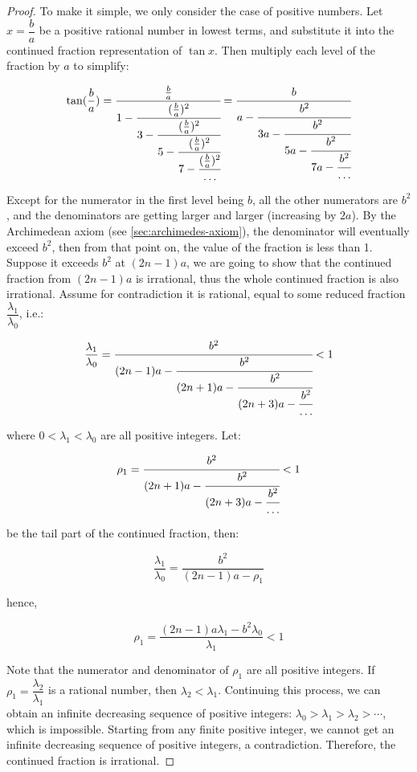 \documentclass[b5paper]{article}
\begin{document}
\begin{proof}
To make it simple, we only consider the case of positive numbers. Let $x = \dfrac{b}{a}$ be a positive rational number in lowest terms, and substitute it into the continued fraction representation of $\tan x$. Then multiply each level of the fraction by $a$ to simplify:

\[
\tan(\frac{b}{a}) = \cfrac{\frac{b}{a}}{1 - \cfrac{(\frac{b}{a})^2}{3 - \cfrac{(\frac{b}{a})^2}{5 - \cfrac{(\frac{b}{a})^2}{7 - \cfrac{(\frac{b}{a})^2}{\dotso}}}}} =
\cfrac{b}{a - \cfrac{b^2}{3a - \cfrac{b^2}{5a - \cfrac{b^2}{7a - \cfrac{b^2}{\dotso}}}}}
\]

Except for the numerator in the first level being $b$, all the other numerators are $b^2$, and the denominators are getting larger and larger (increasing by $2a$). By the Archimedean axiom (see \cref{sec:archimedes-axiom}), the denominator will eventually exceed $b^2$, then from that point on, the value of the fraction is less than 1. Suppose it exceeds $b^2$ at $(2n - 1)a$, we are going to show that the continued fraction from $(2n - 1)a$ is irrational, thus the whole continued fraction is also irrational. Assume for contradiction it is rational, equal to some reduced fraction $\dfrac{\lambda_1}{\lambda_0}$, i.e.:

\[
\frac{\lambda_1}{\lambda_0} = \cfrac{b^2}{(2n - 1)a - \cfrac{b^2}{(2n + 1)a - \cfrac{b^2}{(2n + 3)a - \cfrac{b^2}{\dotso}}}} < 1
\]

where $0 < \lambda_1 < \lambda_0$ are all positive integers. Let:

\[
\rho_1 = \cfrac{b^2}{(2n + 1)a - \cfrac{b^2}{(2n + 3)a - \cfrac{b^2}{\dotso}}} < 1
\]

be the tail part of the continued fraction, then:

\[
\frac{\lambda_1}{\lambda_0} = \frac{b^2}{(2n - 1)a - \rho_1}
\]

hence,

\[
\rho_1 = \frac{(2n - 1)a\lambda_1 - b^2\lambda_0}{\lambda_1} < 1
\]

Note that the numerator and denominator of $\rho_1$ are all positive integers. If $\rho_1 = \dfrac{\lambda_2}{\lambda_1}$ is a rational number, then $\lambda_2 < \lambda_1$. Continuing this process, we can obtain an infinite decreasing sequence of positive integers: $\lambda_0 > \lambda_1 > \lambda_2 > \dotsb$, which is impossible. Starting from any finite positive integer, we cannot get an infinite decreasing sequence of positive integers, a contradiction. Therefore, the continued fraction is irrational.
\end{proof}
\end{document}
